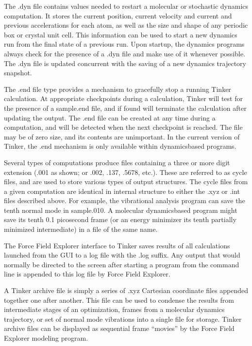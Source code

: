 \documentclass[letterpaper,11pt,english]{sphinxmanual}
\begin{document}
The .dyn file contains values needed to restart a molecular or stochastic dynamics computation. It stores the current position, current velocity and current and previous accelerations for each atom, as well as the size and shape of any periodic box or crystal unit cell. This information can be used to start a new dynamics run from the final state of a previous run. Upon startup, the dynamics programs always check for the presence of a .dyn file and make use of it whenever possible. The .dyn file is updated concurrent with the saving of a new dynamics trajectory snapshot.


The .end file type provides a mechanism to gracefully stop a running Tinker calculation. At appropriate checkpoints during a calculation, Tinker will test for the presence of a sample.end file, and if found will terminate the calculation after updating the output. The .end file can be created at any time during a computation, and will be detected when the next checkpoint is reached. The file may be of zero size, and its contents are unimportant. In the current version of Tinker, the .end mechanism is only available within dynamics\sphinxhyphen{}based programs.


Several types of computations produce files containing a three or more digit extension (.001 as shown; or .002, .137, .5678, etc.). These are referred to as cycle files, and are used to store various types of output structures. The cycle files from a given computation are identical in internal structure to either the .xyz or .int files described above. For example, the vibrational analysis program can save the tenth normal mode in sample.010. A molecular dynamics\sphinxhyphen{}based program might save its tenth 0.1 picosecond frame (or an energy minimizer its tenth partially minimized intermediate) in a file of the same name.


The Force Field Explorer interface to Tinker saves results of all calculations launched from the GUI to a log file with the .log suffix. Any output that would normally be directed to the screen after starting a program from the command line is appended to this log file by Force Field Explorer.


A Tinker archive file is simply a series of .xyz Cartesian coordinate files appended together one after another. This file can be used to condense the results from intermediate stages of an optimization, frames from a molecular dynamics trajectory, or set of normal mode vibrations into a single file for storage. Tinker archive files can be displayed as sequential frame “movies” by the Force Field Explorer modeling program.
\end{document}
